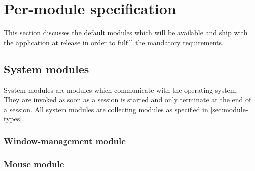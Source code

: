 \section{Per-module specification}
\label{sec:modules}
This section discusses the default \glspl{module} which will be available and ship with the application at release in order to fulfill the mandatory requirements.

\subsection{System modules}
\label{sec:system-modules}

System modules are \glspl{module} which communicate with the operating system. They are invoked as soon as a \gls{session} is started and only terminate at the end of a \gls{session}. All system \glspl{module} are \hyperref[collecting-module]{collecting modules} as specified in \ref{sec:module-types}.

\subsubsection{Window-management module}

\begin{itemize}
\end{itemize}

\subsubsection{Mouse module}

\begin{itemize}
\end{itemize}

